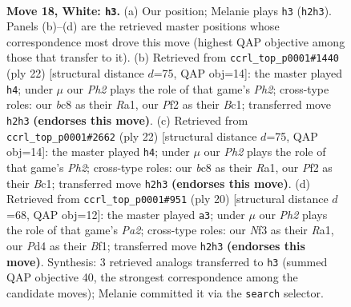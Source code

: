 \documentclass[11pt]{article}
\begin{document}
\clearpage

\begin{figure}[p]\centering
\begin{subfigure}{0.46\textwidth}\centering
\resizebox{\linewidth}{!}{%
\newchessgame
\chessboard[
  setfen={r1bk1b1r/ppq3pp/2p5/3p1p2/P2P4/1Q2PN2/1P3PPP/1RB1K2R w K - 1 18},
  showmover=false,
  pgfstyle=straightmove, color=movearrow, markmove={h2-h3}
]}
\caption{}
\end{subfigure}\hfill
\begin{subfigure}{0.46\textwidth}\centering
\resizebox{\linewidth}{!}{%
\newchessgame
\chessboard[
  setfen={rn1qk2r/p3bppp/1p6/2ppP3/3P4/2P2NP1/P1Q2P1P/R1B2K1R w kq - 0 12},
  showmover=false,
  pgfstyle=straightmove, color=movearrow, markmove={h2-h4}
]}
\caption{}
\end{subfigure}
\\[4pt]
\begin{subfigure}{0.46\textwidth}\centering
\resizebox{\linewidth}{!}{%
\newchessgame
\chessboard[
  setfen={rn1qk2r/p3bppp/1p6/2ppP3/3P4/2P2NP1/P1Q2P1P/R1B2K1R w kq - 0 12},
  showmover=false,
  pgfstyle=straightmove, color=movearrow, markmove={h2-h4}
]}
\caption{}
\end{subfigure}\hfill
\begin{subfigure}{0.46\textwidth}\centering
\resizebox{\linewidth}{!}{%
\newchessgame
\chessboard[
  setfen={r1b1k2r/ppp1bp1p/n2q4/3Ppp2/2P5/2N5/PPQ2PPP/R3KBNR w KQkq - 4 11},
  showmover=false,
  pgfstyle=straightmove, color=movearrow, markmove={a2-a3}
]}
\caption{}
\end{subfigure}
\caption{\textbf{Move 18, White: \texttt{h3}.} (a) Our position; Melanie plays \texttt{h3} (\texttt{h2h3}). Panels (b)--(d) are the retrieved master positions whose correspondence most drove this move (highest QAP objective among those that transfer to it). (b) Retrieved from \texttt{ccrl\_top\_p0001\#1440} (ply 22) [structural distance $d$=75, QAP obj=14]: the master played \texttt{h4}; under $\mu$ our \emph{Ph2} plays the role of that game's \emph{Ph2}; cross-type roles: our \emph{b}c8 as their \emph{R}a1, our \emph{P}f2 as their \emph{B}c1; transferred move \texttt{h2h3} \textbf{(endorses this move)}. (c) Retrieved from \texttt{ccrl\_top\_p0001\#2662} (ply 22) [structural distance $d$=75, QAP obj=14]: the master played \texttt{h4}; under $\mu$ our \emph{Ph2} plays the role of that game's \emph{Ph2}; cross-type roles: our \emph{b}c8 as their \emph{R}a1, our \emph{P}f2 as their \emph{B}c1; transferred move \texttt{h2h3} \textbf{(endorses this move)}. (d) Retrieved from \texttt{ccrl\_top\_p0001\#951} (ply 20) [structural distance $d$=68, QAP obj=12]: the master played \texttt{a3}; under $\mu$ our \emph{Ph2} plays the role of that game's \emph{Pa2}; cross-type roles: our \emph{N}f3 as their \emph{R}a1, our \emph{P}d4 as their \emph{B}f1; transferred move \texttt{h2h3} \textbf{(endorses this move)}. Synthesis: 3 retrieved analogs transferred to \texttt{h3} (summed QAP objective 40, the strongest correspondence among the candidate moves); Melanie committed it via the \texttt{search} selector.}
\label{fig:thought-m34}
\end{figure}
\end{document}
